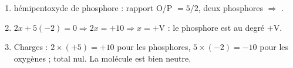 \documentclass[11pt,a4paper]{article}
\begin{document}
\begin{corrige}
\begin{enumerate}[label=\alph*)]
  \item hémipentoxyde de phosphore : rapport O/P $=5/2$, deux phosphores $\Rightarrow$ .
  \item $2x+5(-2)=0 \Rightarrow 2x=+10 \Rightarrow x=+\mathrm{V}$ : le phosphore est au degré $+\mathrm{V}$.
  \item Charges : $2\times(+5)=+10$ pour les phosphores, $5\times(-2)=-10$ pour les oxygènes ; total nul.
        La molécule est bien neutre.
\end{enumerate}
\end{corrige}
\end{document}
